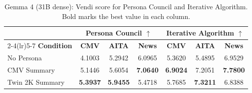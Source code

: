 \begin{table}[H]
\centering
\caption{Gemma 4 (31B dense): Vendi score for Persona Council and Iterative Algorithm. Bold marks the best value in each column.}
\label{tab:model-gemma4}
\small
\begin{tabular}{l|ccc|ccc}
\toprule
& \multicolumn{3}{c|}{\textbf{Persona Council} $\uparrow$} & \multicolumn{3}{c}{\textbf{Iterative Algorithm} $\uparrow$} \\
\cmidrule(lr){2-4}\cmidrule(lr){5-7}
\textbf{Condition} & \textbf{CMV} & \textbf{AITA} & \textbf{News} & \textbf{CMV} & \textbf{AITA} & \textbf{News} \\
\midrule
No Persona & 4.1003 & 5.2942 & 6.0965 & 5.3620 & 5.4895 & 6.9529 \\
CMV Summary & 5.1446 & 5.6054 & \textbf{7.0640} & \textbf{6.9024} & 7.2051 & \textbf{7.7800} \\
Twin 2K Summary & \textbf{5.3937} & \textbf{5.9455} & 5.4718 & 5.7685 & \textbf{7.3211} & 6.8388 \\
\bottomrule
\end{tabular}
\end{table}

